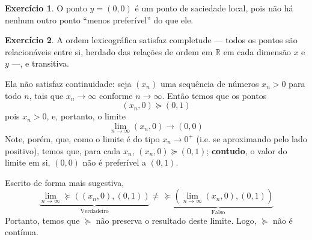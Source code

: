 \documentclass[12pt]{article}
\numberwithin{equation}{section}
\theoremstyle{plain}
\theoremstyle{definition}
\newtheorem{exercise}{Exercício}
\theoremstyle{remark}
\newcommand{\pref}{\succeq}
\begin{document}
\begin{exercise}
 O ponto $y = (0, 0)$ é um ponto de saciedade local, pois não há nenhum outro ponto ``menos preferível'' do que ele. 
\end{exercise}

\begin{exercise}
  A ordem lexicográfica satisfaz completude --- todos os pontos são relacionáveis entre si, herdado das relações de ordem em $\mathbb{R}$ em cada dimensão $x$ e $y$ ---, e transitiva.
  
  Ela não satisfaz continuidade: seja $(x_n)$ uma sequência de números $x_n > 0$ para todo $n$, tais que $x_n \to \infty $ conforme $n \to \infty$. Então temos que os pontos 
  \[(x_n, 0) \pref (0, 1)
  \]
  pois $x_n > 0$, e, portanto, o limite
  \[
  \lim\limits_{n \to \infty} (x_n, 0) \to (0, 0)
  \]
  Note, porém, que, como o limite é do tipo $x_n \to 0^+$ (i.e. se aproximando pelo lado positivo), temos que, para cada $x_n$, $(x_n, 0) \pref (0, 1)$; \textbf{contudo}, o valor do limite em si, $(0, 0)$ não é preferível a $(0, 1)$.  
  
  Escrito de forma mais sugestiva, 
  \[
  \underbrace{ \lim\limits_{n \to \infty} \pref\left((x_n, 0), (0, 1)\right) }_{ \text{Verdadeiro} } \neq \, \underbrace{ \pref\left(\lim\limits_{n \to \infty} (x_n, 0), (0, 1)\right) }_{ \text{Falso} }
  \]
  Portanto, temos que $\pref$ não preserva o resultado deste limite. Logo, $\pref$ não é contínua. 

\end{exercise}

\printbibliography
\end{document}
